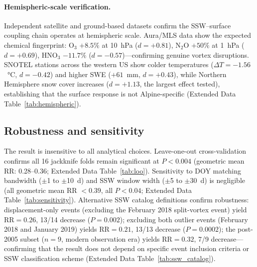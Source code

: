 \documentclass[11pt,letterpaper]{article}
\begin{document}
\paragraph{Hemispheric-scale verification.} Independent satellite and ground-based datasets confirm the SSW--surface coupling chain operates at hemispheric scale. Aura/MLS data show the expected chemical fingerprint: O$_3$ $+8.5\%$ at 10~hPa ($d = +0.81$), N$_2$O $+50\%$ at 1~hPa ($d = +0.69$), HNO$_3$ $-11.7\%$ ($d = -0.57$)---confirming genuine vortex disruptions. SNOTEL stations across the western US show colder temperatures ($\Delta T = -1.56$~°C, $d = -0.42$) and higher SWE ($+61$~mm, $d = +0.43$), while Northern Hemisphere snow cover increases ($d = +1.13$, the largest effect tested), establishing that the surface response is not Alpine-specific (Extended Data Table~\ref{tab:hemispheric}).

\subsection*{Robustness and sensitivity}

The result is insensitive to all analytical choices. Leave-one-out cross-validation confirms all 16 jackknife folds remain significant at $P < 0.004$ (geometric mean RR: 0.28--0.36; Extended Data Table~\ref{tab:loo}). Sensitivity to DOY matching bandwidth ($\pm$1 to $\pm$10~d) and SSW window width ($\pm$5 to $\pm$30~d) is negligible (all geometric mean RR $< 0.39$, all $P < 0.04$; Extended Data Table~\ref{tab:sensitivity}). Alternative SSW catalog definitions confirm robustness: displacement-only events (excluding the February 2018 split-vortex event) yield $\mathrm{RR} = 0.26$, 13/14 decrease ($P = 0.002$); excluding both outlier events (February 2018 and January 2019) yields $\mathrm{RR} = 0.21$, 13/13 decrease ($P = 0.0002$); the post-2005 subset ($n = 9$, modern observation era) yields $\mathrm{RR} = 0.32$, 7/9 decrease---confirming that the result does not depend on specific event inclusion criteria or SSW classification scheme (Extended Data Table~\ref{tab:ssw_catalog}).
\end{document}
